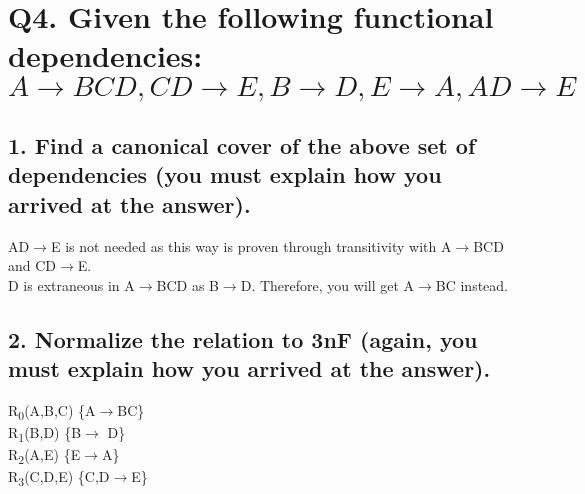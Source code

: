 \documentclass[12pt]{article}
\newcommand\tab[1][1cm]{\hspace*{#1}}
\begin{document}
\section*{Q4. Given the following functional dependencies: \\
$A\rightarrow BCD, CD\rightarrow E, B\rightarrow D, E\rightarrow A,AD\rightarrow E$}
%

\subsection*{1. Find a canonical cover of the above set of dependencies (you must explain how you arrived at the answer).}
%
\tab AD$\rightarrow$E is not needed as this way is proven through transitivity with A$\rightarrow$BCD and CD$\rightarrow$E. \\
\tab D is extraneous in A$\rightarrow$BCD as B$\rightarrow$D. Therefore, you will get A$\rightarrow$BC instead. 
\subsection*{2. Normalize the relation to 3nF (again, you must explain how you arrived at the answer).}
%
R\textsubscript{0}(A,B,C) \{A$\rightarrow$BC\} \\
R\textsubscript{1}(B,D) \{B$\rightarrow$ D\} \\
R\textsubscript{2}(A,E) \{E$\rightarrow$A\}\\
R\textsubscript{3}(C,D,E) \{C,D$\rightarrow$E\}
\end{document}
